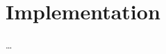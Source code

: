 
\chapter{Implementation} %



\ifpdf
    \graphicspath{{4_implementation/figures/PNG/}{4_implementation/figures/PDF/}{4_implementation/figures/}}
\else
    \graphicspath{{4_implementation/figures/EPS/}{4_implementation/figures/}}
\fi


% 

\dots



